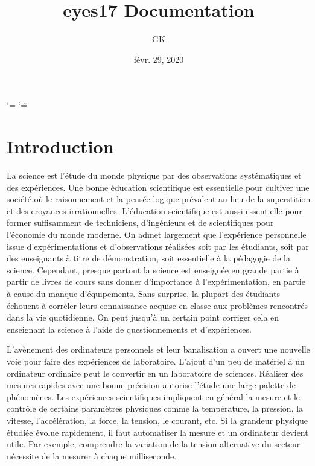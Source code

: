 \documentclass[a4paper,12pt,french]{sphinxmanual}
\title{eyes17 Documentation}
\date{févr. 29, 2020}
\author{GK}
\begin{document}
\ifdefined\shorthandoff
  \ifnum\catcode`\=\string=\active\shorthandoff{=}\fi
  \ifnum\catcode`\"=\active{}\fi
\fi

\pagestyle{empty}


\pagestyle{plain}
\sphinxtableofcontents
\pagestyle{normal}
\label{\detokenize{index::doc}}



\chapter{Introduction}
\label{\detokenize{1.1:introduction}}\label{\detokenize{1.1::doc}}
La science est l’étude du monde physique par des observations systématiques
et des expériences. Une bonne éducation scientifique est essentielle
pour cultiver une société où le raisonnement et la pensée logique
prévalent au lieu de la superstition et des croyances irrationnelles.
L’éducation scientifique est aussi essentielle pour former suffisamment
de techniciens, d’ingénieurs et de scientifiques pour l’économie du
monde moderne. On admet largement que l’expérience personnelle issue
d’expérimentations et d’observations réalisées soit par les étudiants,
soit par des enseignants à titre de démonstration, soit essentielle
à la pédagogie de la science. Cependant, presque partout la science
est enseignée en grande partie à partir de livres de cours sans donner
d’importance à l’expérimentation, en partie à cause du manque d’équipements.
Sans surprise, la plupart des étudiants échouent à corréler leurs
connaissance acquise en classe aux problèmes rencontrés dans la vie
quotidienne. On peut jusqu’à un certain point corriger cela en enseignant
la science à l’aide de questionnements et d’expériences.

L’avènement des ordinateurs personnels et leur banalisation a ouvert
une nouvelle voie pour faire des expériences de laboratoire. L’ajout
d’un peu de matériel à un ordinateur ordinaire peut le convertir en
un laboratoire de sciences. Réaliser des mesures rapides avec une
bonne précision autorise l’étude une large palette de phénomènes.
Les expériences scientifiques impliquent en général la mesure et le
contrôle de certains paramètres physiques comme la température, la
pression, la vitesse, l’accélération, la force, la tension, le courant,
etc. Si la grandeur physique étudiée évolue rapidement, il faut automatiser
la mesure et un ordinateur devient utile. Par exemple, comprendre
la variation de la tension alternative du secteur nécessite de la
mesurer à chaque milliseconde.
\end{document}
